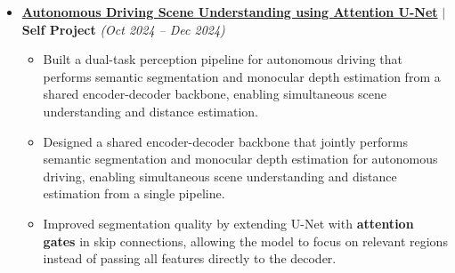 \documentclass[10pt]{extarticle}
\begin{document}
\begin{itemize}[itemsep=7pt]
\begin{itemize}
        \item Built \textbf{FaceForge}, a \textbf{21.3M-parameter} conditional \textbf{DDPM} from scratch generating CelebA faces matching user-selected attributes such as gender, age, hair color, glasses, and facial hair via classifier-free guidance; embedded all \textbf{10 CelebA attributes} into the diffusion process for controllable generation instead of random face synthesis, and optimized the U-Net by restricting self-attention to low-resolution feature maps and swapping transposed convolutions for nearest-neighbor upsampling to reduce computation while avoiding visual artifacts.
        \item Achieved an \textbf{FID of 14.07} with the DDPM model, and accelerated generation with \textbf{50-step DDIM sampling}, delivering \textbf{20x faster} inference than the standard 1000-step diffusion process.
        \item Evaluated generation quality with FID and Inception Score, reaching an \textbf{FID of 14.07}, and used \textbf{50-step DDIM sampling} to deliver \textbf{20x faster} inference than the standard 1000-step diffusion process while maintaining image quality.
        \item Enabled multi-GPU training with \textbf{PyTorch Data Parallel} to accelerate model training.
        \item Accelerated model training by enabling multi-GPU training via \textbf{PyTorch Data Parallel}.
    \end{itemize}
    \item \textbf{\href{https://github.com/cjaitej/Self-Driving-Cars}{Autonomous Driving Scene Understanding using Attention U-Net}} $|$ \textbf{Self Project} \hfill \textit{(Oct 2024 -- Dec 2024)}
    \begin{itemize}
        \item Built a dual-task perception pipeline for autonomous driving that performs semantic segmentation and monocular depth estimation from a shared encoder-decoder backbone, enabling simultaneous scene understanding and distance estimation.
        \item Designed a shared encoder-decoder backbone that jointly performs semantic segmentation and monocular depth estimation for autonomous driving, enabling simultaneous scene understanding and distance estimation from a single pipeline.
        \item Improved segmentation quality by extending U-Net with \textbf{attention gates} in skip connections, allowing the model to focus on relevant regions instead of passing all features directly to the decoder.

\end{itemize}
\end{itemize}
\end{document}
